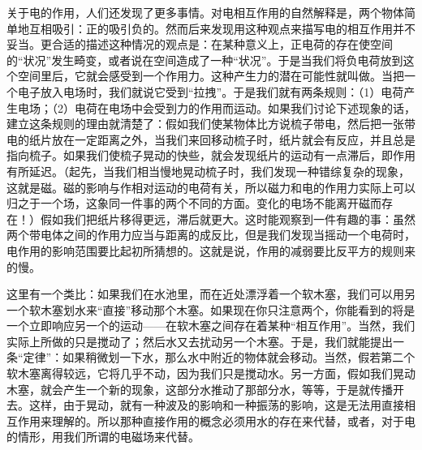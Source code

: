 关于电的作用，人们还发现了更多事情。对电相互作用的自然解释是，两个物体简单地互相吸引：正的吸引负的。然而后来发现用这种观点来描写电的相互作用并不妥当。更合适的描述这种情况的观点是：在某种意义上，正电荷的存在使空间的“状况”发生畸变，或者说在空间造成了一种“状况”。于是当我们将负电荷放到这个空间里后，它就会感受到一个作用力。这种产生力的潜在可能性就叫做。当把一个电子放入电场时，我们就说它受到“拉拽”。于是我们就有两条规则：（1）电荷产生电场；（2）电荷在电场中会受到力的作用而运动。如果我们讨论下述现象的话，建立这条规则的理由就清楚了：假如我们使某物体比方说梳子带电，然后把一张带电的纸片放在一定距离之外，当我们来回移动梳子时，纸片就会有反应，并且总是指向梳子。如果我们使梳子晃动的快些，就会发现纸片的运动有一点滞后，即作用有所延迟。（起先，当我们相当慢地晃动梳子时，我们发现一种错综复杂的现象，这就是磁。磁的影响与作相对运动的电荷有关，所以磁力和电的作用力实际上可以归之于一个场，这象同一件事的两个不同的方面。变化的电场不能离开磁而存在！）假如我们把纸片移得更远，滞后就更大。这时能观察到一件有趣的事：虽然两个带电体之间的作用力应当与距离的成反比，但是我们发现当摇动一个电荷时，电作用的影响范围要比起初所猜想的。这就是说，作用的减弱要比反平方的规则来的慢。

这里有一个类比：如果我们在水池里，而在近处漂浮着一个软木塞，我们可以用另一个软木塞划水来“直接”移动那个木塞。如果现在你只注意两个，你能看到的将是一个立即响应另一个的运动——在软木塞之间存在着某种“相互作用”。当然，我们实际上所做的只是搅动了；然后水又去扰动另一个木塞。于是，我们就能提出一条“定律”：如果稍微划一下水，那么水中附近的物体就会移动。当然，假若第二个软木塞离得较远，它将几乎不动，因为我们只是搅动水。另一方面，假如我们晃动木塞，就会产生一个新的现象，这部分水推动了那部分水，等等，于是就传播开去。这样，由于晃动，就有一种波及的影响和一种振荡的影响，这是无法用直接相互作用来理解的。所以那种直接作用的概念必须用水的存在来代替，或者，对于电的情形，用我们所谓的电磁场来代替。

